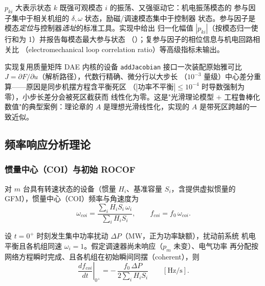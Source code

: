 \begin{remark}[物理解释与实现口径]
$p_{ki}$ 大表示状态 $k$ 既强可观模态 $i$ 的振荡、又强驱动它：机电振荡模态的
参与因子集中于相关机组的 $\delta,\omega$ 状态，励磁/调速模态集中于控制器
状态。参与因子是模态\emph{定位}与控制器\emph{选址}的标准工具。实现中给出
归一化幅值 $|p_{ki}|$（按模态归一使行和为 1）并报告每模态最大参与状态
（）；复参与因子的相位信息与机电回路相关比
（electromechanical loop correlation ratio）等高级指标未输出。
\end{remark}

\begin{remark}[降阶矩阵的装配与病态处理]
实现复用质量矩阵 DAE 内核的设备 \texttt{addJacobian} 接口一次装配原始雅可比
$J=\partial F/\partial u$（解析路径），代数行精确、微分行以大步长
（$10^{-3}$ 量级）中心差分重算——原因是同步机摆方程含平衡死区
（$|\text{功率不平衡}|\le10^{-4}$ 时导数强制为零），小步长差分会被死区截获而
线性化为零。这是"光滑理论模型 $+$ 工程鲁棒化数值"的典型案例：理论章的 $A$
是理想光滑线性化，实现的 $A$ 是带死区跨越的一致近似。
\end{remark}

\subsection{频率响应分析理论}\label{sec:dy-th-ctl-freq}

\subsubsection{惯量中心（COI）与初始 ROCOF}

\begin{definition}[惯量中心频率]\label{sec:dy-th-ctl-def-coi}
对 $m$ 台具有转速状态的设备（惯量 $H_i$、基准容量 $S_i$，含提供虚拟惯量的
GFM），惯量中心（COI）频率与角速度为
\begin{equation}
\omega_{coi}=\frac{\sum_i H_iS_i\,\omega_i}{\sum_i H_iS_i},\qquad
f_{coi}=f_0\,\omega_{coi}.
\label{sec:dy-th-ctl-eq-coi}
\end{equation}
\end{definition}

\begin{theorem}[初始 ROCOF 公式]\label{sec:dy-th-ctl-thm-rocof}
设 $t=0^+$ 时刻发生集中功率扰动 $\Delta P$（MW，正为功率缺额），扰动前系统
机电平衡且各机组同速 $\omega_i=1$。假定调速器尚未响应（$p_m$ 未变）、电气功率
再分配按网络方程瞬时完成、且各机组在初始瞬间同摆（coherent），则
\begin{equation}
\left.\frac{df_{coi}}{dt}\right|_{0^+}
=-\,\frac{f_0\,\Delta P}{2\sum_i H_iS_i}
\qquad[\mathrm{Hz/s}].
\label{sec:dy-th-ctl-eq-rocof}
\end{equation}
\end{theorem}

